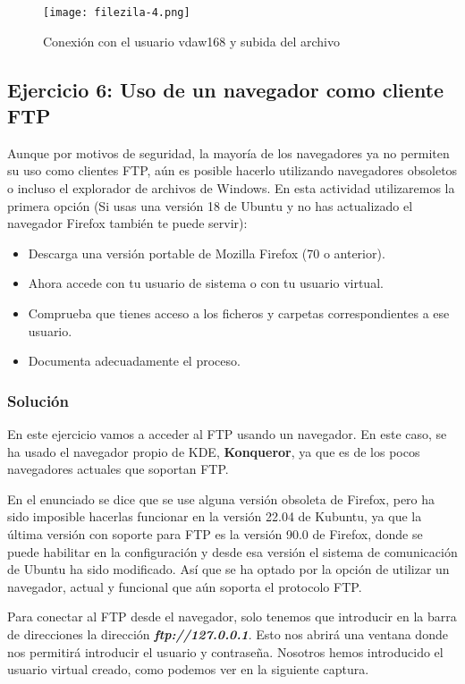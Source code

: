 \begin{figure}[H]
    \centering
    \texttt{[image: filezila-4.png]}
    \caption{Conexión con el usuario vdaw168 y subida del archivo}
\end{figure}

\subsection{Ejercicio 6: Uso de un navegador como cliente FTP}
Aunque por motivos de seguridad, la mayoría de los navegadores ya no permiten su uso como clientes FTP, aún es posible hacerlo utilizando navegadores obsoletos o incluso el explorador de archivos de Windows. En esta actividad utilizaremos la primera opción (Si usas una versión 18 de Ubuntu y no has actualizado el navegador Firefox también te puede servir):

\begin{itemize}
    \item Descarga una versión portable de Mozilla Firefox (70 o anterior).
    \item Ahora accede con tu usuario de sistema o con tu usuario virtual.
    \item Comprueba que tienes acceso a los ficheros y carpetas correspondientes a ese usuario.
    \item Documenta adecuadamente el proceso.
\end{itemize}

\subsubsection{Solución}
En este ejercicio vamos a acceder al FTP usando un navegador. En este caso, se ha usado el navegador propio de KDE, \textbf{Konqueror}, ya que es de los pocos navegadores actuales que soportan FTP.

En el enunciado se dice que se use alguna versión obsoleta de Firefox, pero ha sido imposible hacerlas funcionar en la versión 22.04 de Kubuntu, ya que la última versión con soporte para FTP es la versión 90.0 de Firefox, donde se puede habilitar en la configuración y desde esa versión el sistema de comunicación de Ubuntu ha sido modificado. Así que se ha optado por la opción de utilizar un navegador, actual y funcional que aún soporta el protocolo FTP.

Para conectar al FTP desde el navegador, solo tenemos que introducir en la barra de direcciones la dirección \textbf{\textit{ftp://127.0.0.1}}. Esto nos abrirá una ventana donde nos permitirá introducir el usuario y contraseña. Nosotros hemos introducido el usuario virtual creado, como podemos ver en la siguiente captura.

